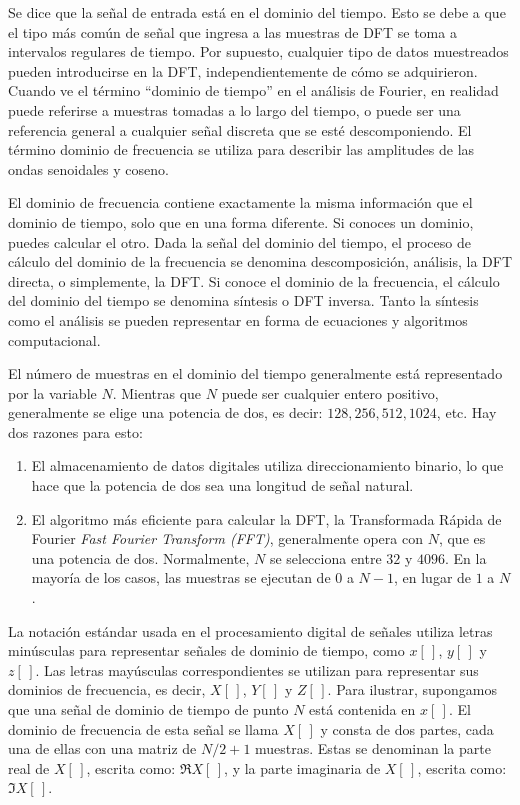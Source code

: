 Se dice que la señal de entrada está en el dominio del tiempo. Esto se debe a que el tipo más común de señal que ingresa a las muestras de DFT se toma a intervalos regulares de tiempo. Por supuesto, cualquier tipo de datos muestreados pueden introducirse en la DFT, independientemente de cómo se adquirieron. Cuando ve el término \enquote{dominio de tiempo} en el análisis de Fourier, en realidad puede referirse a muestras tomadas a lo largo del tiempo, o puede ser una referencia general a cualquier señal discreta que se esté descomponiendo. El término dominio de frecuencia se utiliza para describir las amplitudes de las ondas senoidales y coseno.
\par
El dominio de frecuencia contiene exactamente la misma información que el dominio de tiempo, solo que en una forma diferente. Si conoces un dominio, puedes calcular el otro. Dada la señal del dominio del tiempo, el proceso de cálculo del dominio de la frecuencia se denomina descomposición, análisis, la DFT directa, o simplemente, la DFT. Si conoce el dominio de la frecuencia, el cálculo del dominio del tiempo se denomina síntesis o DFT inversa. Tanto la síntesis como el análisis se pueden representar en forma de ecuaciones y algoritmos computacional.
\par
El número de muestras en el dominio del tiempo generalmente está representado por la variable $N$. Mientras que $N$ puede ser cualquier entero positivo, generalmente se elige una potencia de dos, es decir: $128, 256, 512, 1024$, etc. Hay dos razones para esto:
\begin{enumerate}
\item El almacenamiento de datos digitales utiliza direccionamiento binario, lo que hace que la potencia de dos sea una longitud de señal natural.
\item El algoritmo más eficiente para calcular la DFT, la Transformada Rápida de Fourier \emph{Fast Fourier Transform (FFT)}, generalmente opera con $N$, que es una potencia de dos. Normalmente, $N$ se selecciona entre $32$ y $4096$. En la mayoría de los casos, las muestras se ejecutan de $0$ a $N - 1$, en lugar de $1$ a $N$.
\end{enumerate}
La notación estándar usada en el procesamiento digital de señales utiliza letras minúsculas para representar señales de dominio de tiempo, como $x[ \, ]$, $y[ \, ]$ y $z [ \, ]$. Las letras mayúsculas correspondientes se utilizan para representar sus dominios de frecuencia, es decir, $X[ \, ]$, $Y[ \, ]$ y $Z[ \, ]$. Para ilustrar, supongamos que una señal de dominio de tiempo de punto $N$ está contenida en $x[ \, ]$. El dominio de frecuencia de esta señal se llama $X[ \, ]$ y consta de dos partes, cada una de ellas con una matriz de $N / 2 + 1$ muestras. Estas se denominan la parte real de $X[ \, ]$, escrita como: $\Re X[ \, ]$, y la parte imaginaria de $X[ \, ]$, escrita como: $\Im X[ \, ]$.
